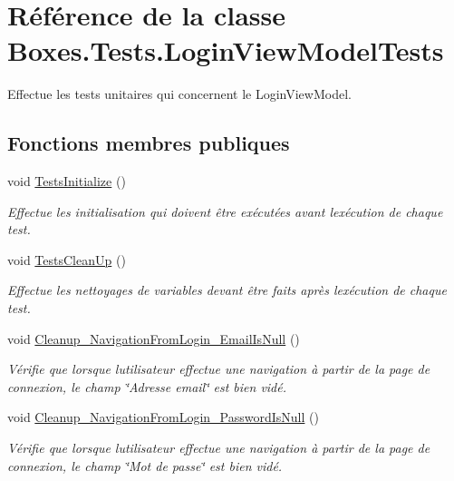 \hypertarget{class_boxes_1_1_tests_1_1_login_view_model_tests}{}\section{Référence de la classe Boxes.\+Tests.\+Login\+View\+Model\+Tests}
\label{class_boxes_1_1_tests_1_1_login_view_model_tests}


Effectue les tests unitaires qui concernent le Login\+View\+Model.  


\subsection*{Fonctions membres publiques}
\begin{DoxyCompactItemize}
\item 
void \hyperlink{class_boxes_1_1_tests_1_1_login_view_model_tests_aeba1576989bbe4a128a96eff58ff1ee4}{Tests\+Initialize} ()
\begin{DoxyCompactList}\small\item\em Effectue les initialisation qui doivent être exécutées avant l\textquotesingle{}exécution de chaque test. \end{DoxyCompactList}\item 
void \hyperlink{class_boxes_1_1_tests_1_1_login_view_model_tests_a284439b5f36f9b6bb4eb1561bce15c8a}{Tests\+Clean\+Up} ()
\begin{DoxyCompactList}\small\item\em Effectue les nettoyages de variables devant être faits après l\textquotesingle{}exécution de chaque test. \end{DoxyCompactList}\item 
void \hyperlink{class_boxes_1_1_tests_1_1_login_view_model_tests_af7348cc41eeafb8d50c913c5d5cb86cb}{Cleanup\+\_\+\+Navigation\+From\+Login\+\_\+\+Email\+Is\+Null} ()
\begin{DoxyCompactList}\small\item\em Vérifie que lorsque l\textquotesingle{}utilisateur effectue une navigation à partir de la page de connexion, le champ \char`\"{}\+Adresse email\char`\"{} est bien vidé. \end{DoxyCompactList}\item 
void \hyperlink{class_boxes_1_1_tests_1_1_login_view_model_tests_aed742d452397322885bea88dcbd9e2d7}{Cleanup\+\_\+\+Navigation\+From\+Login\+\_\+\+Password\+Is\+Null} ()
\begin{DoxyCompactList}\small\item\em Vérifie que lorsque l\textquotesingle{}utilisateur effectue une navigation à partir de la page de connexion, le champ \char`\"{}\+Mot de passe\char`\"{} est bien vidé. \end{DoxyCompactList}\item 

\end{DoxyCompactItemize}
